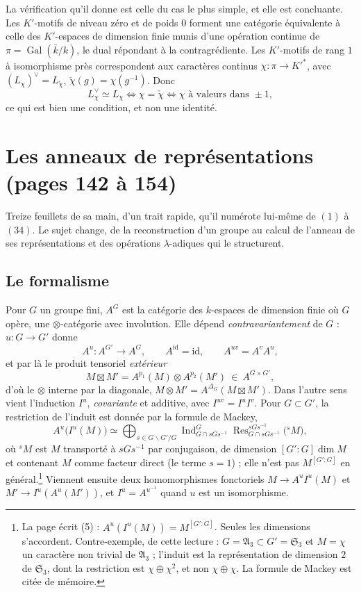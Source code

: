 \documentclass[11pt,a4paper]{article}
\begin{document}
La vérification qu'il donne est celle du cas le plus simple, et elle est
concluante. Les $K'$-motifs de niveau zéro et de poids $0$ forment une catégorie
équivalente à celle des $K'$-espaces de dimension finie munis d'une opération
continue de $\pi = \operatorname{Gal}(\bar{k}/k)$, le dual répondant à la
contragrédiente. Les $K'$-motifs de rang $1$ à isomorphisme près correspondent
aux caractères continus $\chi \colon \pi \to K'^{*}$, avec
$(L_{\chi})^{\vee} = L_{\check{\chi}}$, $\check{\chi}(g) = \chi(g^{-1})$. Donc
\[
L_{\chi}^{\vee} \simeq L_{\chi}
\iff \chi = \check{\chi}
\iff \chi \text{ à valeurs dans } \pm 1 ,
\]
ce qui est bien une condition, et non une identité.

\section*{Les anneaux de représentations (pages 142 à 154)}

Treize feuillets de sa main, d'un trait rapide, qu'il numérote lui-même de
$(1)$ à $(34)$. Le sujet change, de la reconstruction d'un groupe au calcul de l'anneau de
ses représentations et des opérations $\lambda$-adiques qui le structurent.

\subsection*{Le formalisme}

Pour $G$ un groupe fini, $A^{G}$ est la catégorie des $k$-espaces de dimension
finie où $G$ opère, une $\otimes$-catégorie avec involution. Elle dépend
\emph{contravariantement} de $G$ : $u \colon G \to G'$ donne
\[
A^{u} \colon A^{G'} \longrightarrow A^{G} ,
\qquad A^{\mathrm{id}} = \mathrm{id} ,
\qquad A^{uv} = A^{v}A^{u} ,
\]
et par là le produit tensoriel \emph{extérieur}
\[
M \boxtimes M' = A^{p_{1}}(M) \otimes A^{p_{2}}(M')
\ \in\ A^{G \times G'} ,
\]
d'où le $\otimes$ interne par la diagonale, $M \otimes M' = A^{\Delta_{G}}
(M \boxtimes M')$. Dans l'autre sens vient l'induction $I^{u}$,
\emph{covariante} et additive, avec $I^{uv} = I^{u}I^{v}$. Pour $G \subset
G'$, la restriction de l'induit est donnée par la formule de Mackey,
\[
A^{u}\bigl( I^{u}(M) \bigr) \simeq \bigoplus_{s \in G \backslash G' / G}
\operatorname{Ind}_{G \cap sGs^{-1}}^{G}
\operatorname{Res}^{sGs^{-1}}_{G \cap sGs^{-1}}\bigl( {}^{s}M \bigr) ,
\]
où ${}^{s}M$ est $M$ transporté à $sGs^{-1}$ par conjugaison, de dimension $[G':G]\dim M$ et contenant $M$ comme facteur direct (le terme
$s = 1$) ; elle n'est pas $M^{[G':G]}$ en général.\footnote{La page écrit
(5) : $A^{u}(I^{u}(M)) = M^{[G':G]}$. Seules les dimensions s'accordent.
Contre-exemple, de cette lecture : $G = \mathfrak{A}_{3} \subset G' =
\mathfrak{S}_{3}$ et $M = \chi$ un caractère non trivial de $\mathfrak{A}_{3}$ ;
l'induit est la représentation de dimension $2$ de $\mathfrak{S}_{3}$, dont la
restriction est $\chi \oplus \chi^{2}$, et non $\chi \oplus \chi$. La formule
de Mackey est citée de mémoire.} Viennent ensuite
deux homomorphismes fonctoriels $M \to A^{u}I^{u}(M)$ et $M' \to
I^{u}(A^{u}(M'))$, et $I^{u} = A^{u^{-1}}$ quand $u$ est un isomorphisme.
\end{document}

